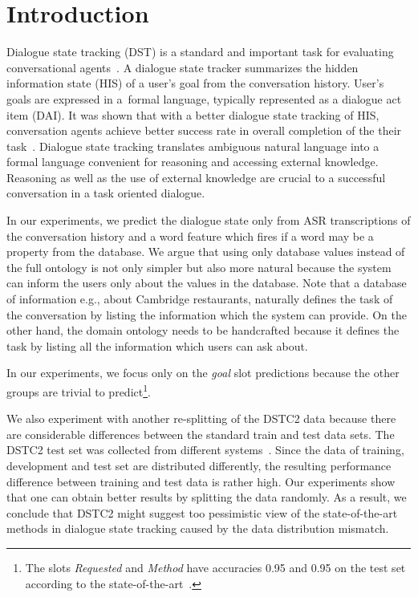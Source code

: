 \documentclass{itatnew}
\def\OD#1{{\color{darkgreen}OD: \it #1}}
\begin{document}
\section{Introduction}
%
Dialogue state tracking (DST) is a standard and important task for evaluating conversational agents~\cite{williams2013dialog, henderson2014second, henderson2014third}.
A dialogue state tracker summarizes the hidden information state (HIS)\cite{young2010hidden} of a user's goal from the conversation history.
User's goals are expressed in a~formal language, typically represented as a dialogue act item (DAI). 
It was shown that with a better dialogue state tracking of HIS, conversation agents achieve better success rate in overall completion of the their task~\cite{jurvcivcek2012reinforcement}.
Dialogue state tracking translates ambiguous natural language into a formal language convenient for reasoning and accessing external knowledge. Reasoning as well as the use of external knowledge are crucial to a successful conversation in a task oriented dialogue.



In our experiments, we predict the dialogue state only from ASR transcriptions of the conversation history and a word feature which fires if a word may be a property from the database.
We argue that using only database values instead of the full ontology is not only simpler but also more natural because the system can inform the users only about the values in the database.
Note that a database of information e.g., about Cambridge restaurants, naturally defines the task of the conversation by listing the information which the system can provide.
On the other hand, the domain ontology needs to be handcrafted because it defines the task by listing all the information which users can ask about.

In our experiments, we focus only on the {\it goal} slot predictions because the other groups are trivial to predict\footnote{The slots {\it Requested} and {\it Method} have accuracies 0.95 and 0.95 on the test set according to the state-of-the-art~\cite{williams2014web}.}.

We also experiment with another re-splitting of the DSTC2 data because there are considerable differences between the standard train and test data sets.
The DSTC2 test set was collected from different systems~\cite{henderson2014second}.
Since the data of training, development and test set are distributed differently, the resulting performance difference between training and test data is rather high.
Our experiments show that one can obtain better results by splitting the data randomly.
As a result, we conclude that DSTC2 might suggest too pessimistic view of the state-of-the-art methods in dialogue state tracking caused by the data distribution mismatch.
\end{document}
